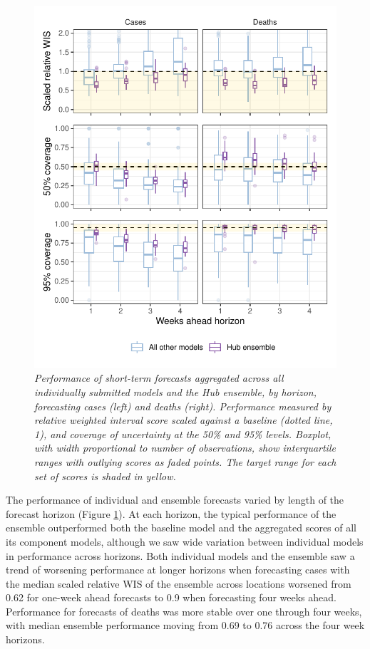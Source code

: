 \documentclass[
]{article}
\begin{document}
\begin{figure}
\centering
\includegraphics{latest_files/figure-latex/performance-horizon-1.pdf}
\caption{\label{fig:performance-horizon}\emph{Performance of short-term forecasts aggregated across all individually submitted models and the Hub ensemble, by horizon, forecasting cases (left) and deaths (right). Performance measured by relative weighted interval score scaled against a baseline (dotted line, 1), and coverage of uncertainty at the 50\% and 95\% levels. Boxplot, with width proportional to number of observations, show interquartile ranges with outlying scores as faded points. The target range for each set of scores is shaded in yellow.}}
\end{figure}

The performance of individual and ensemble forecasts varied by length of the forecast horizon (Figure \ref{fig:performance-horizon}). At each horizon, the typical performance of the ensemble outperformed both the baseline model and the aggregated scores of all its component models, although we saw wide variation between individual models in performance across horizons. Both individual models and the ensemble saw a trend of worsening performance at longer horizons when forecasting cases with the median scaled relative WIS of the ensemble across locations worsened from 0.62 for one-week ahead forecasts to 0.9 when forecasting four weeks ahead. Performance for forecasts of deaths was more stable over one through four weeks, with median ensemble performance moving from 0.69 to 0.76 across the four week horizons.
\end{document}
